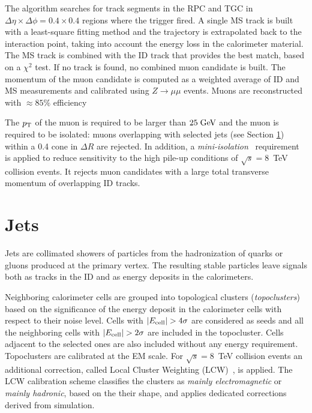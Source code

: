 The algorithm searches for track segments in the RPC and TGC in
$\Delta\eta\times\Delta\phi=0.4\times0.4$ regions where the trigger
fired. A single MS track is built with a least-square fitting method and
the trajectory is extrapolated back to the interaction point, taking
into account the energy loss in the calorimeter material. 
The MS track is combined with the ID track that provides the best
match, based on a $\chi^2$ test. If no track is found, no combined
muon candidate is built.
The momentum of the muon candidate is computed as a weighted average
of ID and MS measurements and calibrated using $Z\to \mu\mu$ events.
Muons are reconstructed with \mbox{$\approx{}85\%$} efficiency

The $p_{\mathrm{T}}$ of the muon is required to be larger than \mbox{$25 \; \mathrm{GeV}{}$}
and the muon is required to be isolated: muons overlapping with selected
jets (see Section \ref{sec:jets}) within a 0.4 cone in $\Delta R$ are
rejected. In addition, a {\it mini-isolation}~\cite{miniisolation}
requirement is applied to reduce sensitivity to the high pile-up
conditions of $\sqrt{s} = $8~TeV collision events. It rejects muon candidates
with a large total transverse momentum of overlapping ID tracks.

\section{Jets}
\label{sec:jets}

Jets are collimated showers of particles from the hadronization of
quarks or gluons produced at the primary vertex.
The resulting stable particles leave signals both as tracks in the ID
and as energy deposits in the calorimeters.

Neighboring calorimeter cells are grouped into topological clusters
({\it topoclusters}) based on the significance of the energy deposit
in the calorimeter cells with respect to their noise
level. Cells with $|E_{\rm cell}|>4\sigma$ are considered as seeds and
all the neighboring cells with $|E_{\rm cell}| > 2\sigma$ are included
in the topocluster. Cells adjacent to the selected ones are also
included without any energy requirement.
Topoclusters are calibrated at the EM scale. For $\sqrt{s} = $8~TeV
collision events an additional correction, called Local Cluster
Weighting (LCW)~\cite{lcwcalib}, is applied. The LCW calibration
scheme classifies the clusters as {\it mainly electromagnetic} or
{\it mainly hadronic}, based on the their shape, and applies
dedicated corrections derived from simulation.


